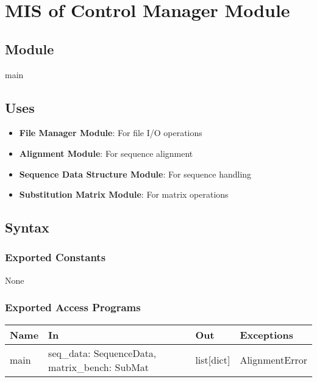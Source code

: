 \documentclass[12pt, titlepage]{article}
\begin{document}
\newpage

\section{MIS of Control Manager Module} \label{mCM}

\subsection{Module}

main

\subsection{Uses}

\begin{itemize}
    \item \textbf{File Manager Module}: For file I/O operations
    \item \textbf{Alignment Module}: For sequence alignment
    \item \textbf{Sequence Data Structure Module}: For sequence handling
    \item \textbf{Substitution Matrix Module}: For matrix operations
\end{itemize}

\subsection{Syntax}

\subsubsection{Exported Constants}

None

\subsubsection{Exported Access Programs}

\begin{center}
\begin{tabular}{p{4cm} p{4cm} p{3cm} p{2cm}}
\hline
\textbf{Name} & \textbf{In} & \textbf{Out} & \textbf{Exceptions} \\
\hline
main & seq\_data: SequenceData, matrix\_bench: SubMat & list[dict] & AlignmentError \\
\hline
\end{tabular}
\end{center}
\end{document}
